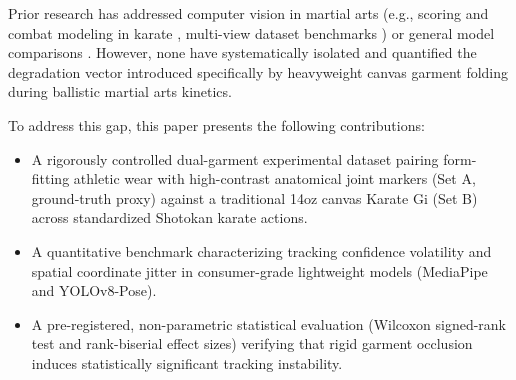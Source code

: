 Prior research has addressed computer vision in martial arts (e.g., scoring and combat modeling in karate \cite{echeverria2021modeling, lu2022aishifu}, multi-view dataset benchmarks \cite{zhang2017martial}) or general model comparisons \cite{dael2026comparative}. However, none have systematically isolated and quantified the degradation vector introduced specifically by heavyweight canvas garment folding during ballistic martial arts kinetics.

To address this gap, this paper presents the following contributions:
\begin{itemize}
    \item A rigorously controlled dual-garment experimental dataset pairing form-fitting athletic wear with high-contrast anatomical joint markers (Set A, ground-truth proxy) against a traditional 14oz canvas Karate Gi (Set B) across standardized Shotokan karate actions.
    \item A quantitative benchmark characterizing tracking confidence volatility and spatial coordinate jitter in consumer-grade lightweight models (MediaPipe and YOLOv8-Pose).
    \item A pre-registered, non-parametric statistical evaluation (Wilcoxon signed-rank test and rank-biserial effect sizes) verifying that rigid garment occlusion induces statistically significant tracking instability.
\end{itemize}
